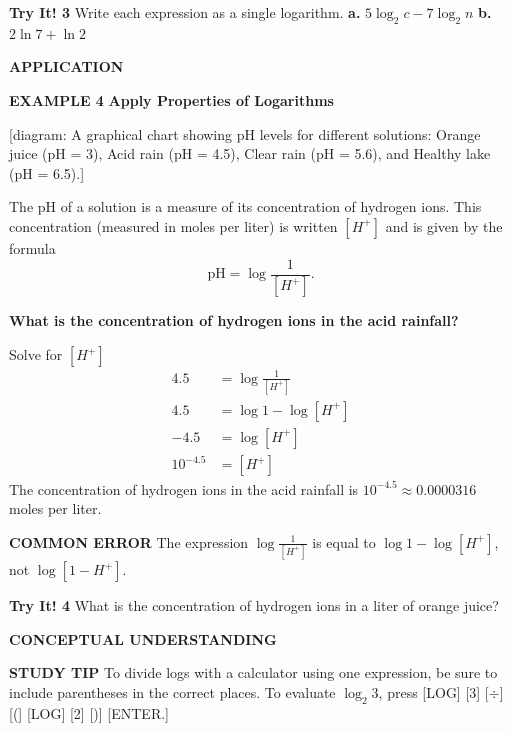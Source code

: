 \documentclass{article}
\newenvironment{example}[1]{\textbf{EXAMPLE #1}}{}
\newenvironment{tryit}[1]{\textbf{Try It! #1}}{}
\newcommand{\answer}[1]{}
\newcommand{\placeholder}[2]{[#1: #2]}
\begin{document}
\begin{tryit}{3}
Write each expression as a single logarithm.
\textbf{a.} $5\log_2 c - 7\log_2 n$ \quad
\textbf{b.} $2\ln 7 + \ln 2$
\answer{a. $\log_2\left(\frac{c^5}{n^7}\right)$ \quad b. $\ln 98$}
\end{tryit}

\vspace{1em}
\textbf{APPLICATION}

\begin{example}{4}
\textbf{Apply Properties of Logarithms}

\placeholder{diagram}{A graphical chart showing pH levels for different solutions: Orange juice (pH = 3), Acid rain (pH = 4.5), Clear rain (pH = 5.6), and Healthy lake (pH = 6.5).}

The pH of a solution is a measure of its concentration of hydrogen ions. This concentration (measured in moles per liter) is written $[H^+]$ and is given by the formula
\[ \text{pH} = \log\frac{1}{[H^+]}. \]

\textbf{What is the concentration of hydrogen ions in the acid rainfall?}

Solve for $[H^+]$
\begin{align*}
4.5 &= \log\frac{1}{[H^+]} \\
4.5 &= \log 1 - \log[H^+] \\
-4.5 &= \log[H^+] \\
10^{-4.5} &= [H^+]
\end{align*}
The concentration of hydrogen ions in the acid rainfall is $10^{-4.5} \approx 0.0000316$ moles per liter.

\textbf{COMMON ERROR}
The expression $\log\frac{1}{[H^+]}$ is equal to $\log 1 - \log[H^+]$, not $\log[1 - H^+]$.
\end{example}

\begin{tryit}{4}
What is the concentration of hydrogen ions in a liter of orange juice?
\answer{$10^{-3} = 0.001$ moles per liter}
\end{tryit}

\vspace{1em}
\textbf{CONCEPTUAL UNDERSTANDING}

\textbf{STUDY TIP}
To divide logs with a calculator using one expression, be sure to include parentheses in the correct places. To evaluate $\log_2 3$, press [LOG] [3] [$\div$] [(] [LOG] [2] [)] [ENTER.]
\end{document}
